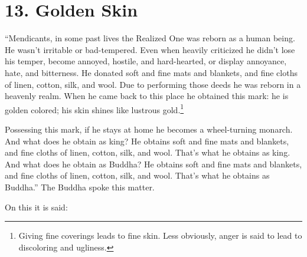 \documentclass[12pt,openany]{book}%
\begin{document}
\section*{13. Golden Skin }

“Mendicants, in some past lives the Realized One was reborn as a human being. He wasn’t irritable or bad-tempered. Even when heavily criticized he didn’t lose his temper, become annoyed, hostile, and hard-hearted, or display annoyance, hate, and bitterness. He donated soft and fine mats and blankets, and fine cloths of linen, cotton, silk, and wool. Due to performing those deeds he was reborn in a heavenly realm. When he came back to this place he obtained this mark: he is golden colored; his skin shines like lustrous gold.\footnote{Giving fine coverings leads to fine skin. Less obviously, anger is said to lead to discoloring and ugliness. } 

Possessing this mark, if he stays at home he becomes a wheel-turning monarch. And what does he obtain as king? He obtains soft and fine mats and blankets, and fine cloths of linen, cotton, silk, and wool. That’s what he obtains as king. And what does he obtain as Buddha? He obtains soft and fine mats and blankets, and fine cloths of linen, cotton, silk, and wool. That’s what he obtains as Buddha.” The Buddha spoke this matter. 

On this it is said: 
\end{document}
